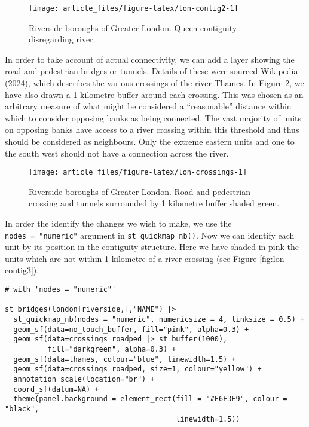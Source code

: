 \begin{figure}

{\centering \texttt{[image: article\_files/figure-latex/lon-contig2-1]} 

}

\caption{Riverside boroughs of Greater London. Queen contiguity disregarding river. }\label{fig:lon-contig2}
\end{figure}

In order to take account of actual connectivity, we can add a layer
showing the road and pedestrian bridges or tunnels. Details of these were sourced Wikipedia (2024), which describes the various crossings of the river Thames. In Figure \ref{fig:lon-crossings}, we have also drawn a 1 kilometre buffer around each crossing. This was chosen as an arbitrary measure of what might be considered a ``reasonable'' distance within which to consider opposing banks as being connected. The vast majority of units on opposing banks have access to a river crossing within this threshold and thus should be considered as neighbours. Only the extreme eastern units and one to the south west should not have a connection across the river.

\begin{figure}

{\centering \texttt{[image: article\_files/figure-latex/lon-crossings-1]} 

}

\caption{Riverside boroughs of Greater London. Road and pedestrian crossing and tunnels surrounded by 1 kilometre buffer shaded green. }\label{fig:lon-crossings}
\end{figure}

In order the identify the changes we wish to make, we use the
\texttt{nodes\ =\ "numeric"} argument in \texttt{st\_quickmap\_nb()}. Now we can identify
each unit by its position in the contiguity structure. Here we have
shaded in pink the units which are not within 1 kilometre of a river
crossing (see Figure \ref{fig:lon-contig3}).

\begin{verbatim}
# with 'nodes = "numeric"'

st_bridges(london[riverside,],"NAME") |> 
  st_quickmap_nb(nodes = "numeric", numericsize = 4, linksize = 0.5) +
  geom_sf(data=no_touch_buffer, fill="pink", alpha=0.3) + 
  geom_sf(data=crossings_roadped |> st_buffer(1000), 
          fill="darkgreen", alpha=0.3) +
  geom_sf(data=thames, colour="blue", linewidth=1.5) + 
  geom_sf(data=crossings_roadped, size=1, colour="yellow") + 
  annotation_scale(location="br") +
  coord_sf(datum=NA) + 
  theme(panel.background = element_rect(fill = "#F6F3E9", colour = "black", 
                                        linewidth=1.5))
\end{verbatim}

